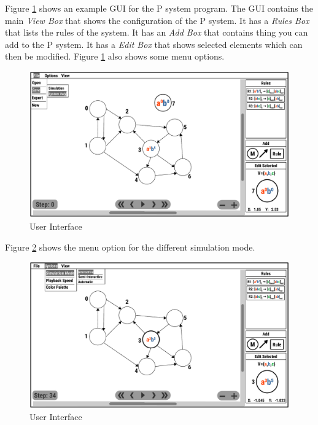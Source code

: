 \documentclass{article}
\begin{document}
Figure \ref{fig:gui-2} shows an example GUI for the P system program. The GUI contains the main
\textit{View Box} that shows the configuration of the P system. It has a \textit{Rules Box} that 
lists the rules of the system. It has an \textit{Add Box} that contains thing you can add to the 
P system. It has a \textit{Edit Box} that shows selected elements which can then be modified.
Figure \ref{fig:gui-2} also shows some menu options.

\begin{figure}[H]
\begin{center}
    \includegraphics[scale=0.5]{figures/zzz-gui-2.pdf}
    \caption{User Interface}
    \label{fig:gui-2}
\end{center}
\end{figure}

Figure \ref{fig:gui} shows the menu option for the different simulation mode.

\begin{figure}[H]
\begin{center}
    \includegraphics[scale=0.5]{figures/zzz-gui.pdf}
    \caption{User Interface}
    \label{fig:gui}
\end{center}
\end{figure}
\end{document}
